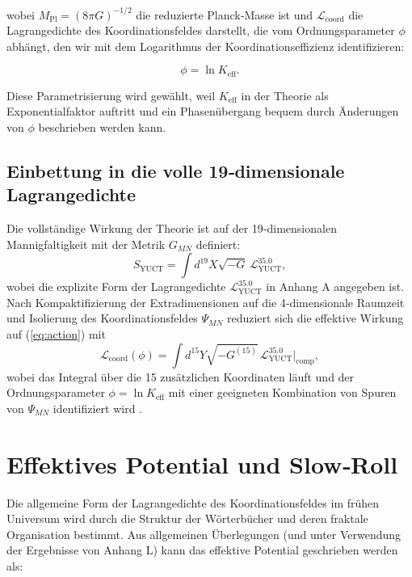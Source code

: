\documentclass[11pt,a4paper]{article}
\newcommand{\Keff}{K_{\mathrm{eff}}}
\newcommand{\Mpl}{M_{\mathrm{Pl}}}
\begin{document}
	wobei \(\Mpl = (8\pi G)^{-1/2}\) die reduzierte Planck‑Masse ist und \(\mathcal{L}_{\mathrm{coord}}\) die Lagrangedichte des Koordinationsfeldes darstellt, die vom Ordnungsparameter \(\phi\) abhängt, den wir mit dem Logarithmus der Koordinationseffizienz identifizieren:
	
	\begin{equation}
		\phi = \ln \Keff.
		\label{eq:phi-def}
	\end{equation}
	
	Diese Parametrisierung wird gewählt, weil \(\Keff\) in der Theorie als Exponentialfaktor auftritt und ein Phasenübergang bequem durch Änderungen von \(\phi\) beschrieben werden kann.
	
	\subsection{Einbettung in die volle 19‑dimensionale Lagrangedichte}
	
	Die vollständige Wirkung der Theorie ist auf der 19‑dimensionalen Mannigfaltigkeit mit der Metrik \(G_{MN}\) definiert:
	\begin{equation}
		S_{\text{YUCT}} = \int d^{19}X \sqrt{-G} \, \mathcal{L}_{\text{YUCT}}^{35.0},
		\label{eq:full-action}
	\end{equation}
	wobei die explizite Form der Lagrangedichte \(\mathcal{L}_{\text{YUCT}}^{35.0}\) in Anhang A angegeben ist. Nach Kompaktifizierung der Extradimensionen auf die 4‑dimensionale Raumzeit und Isolierung des Koordinationsfeldes \(\Psi_{MN}\) reduziert sich die effektive Wirkung auf (\ref{eq:action}) mit
	\begin{equation}
		\mathcal{L}_{\mathrm{coord}}(\phi) = \int d^{15}Y \sqrt{-G^{(15)}} \, \mathcal{L}_{\text{YUCT}}^{35.0}\big|_{\text{comp}},
	\end{equation}
	wobei das Integral über die 15 zusätzlichen Koordinaten läuft und der Ordnungsparameter \(\phi = \ln\Keff\) mit einer geeigneten Kombination von Spuren von \(\Psi_{MN}\) identifiziert wird \cite{Yakushev2026}.
	
	\section{Effektives Potential und Slow‑Roll}
	\label{sec:potential}
	
	Die allgemeine Form der Lagrangedichte des Koordinationsfeldes im frühen Universum wird durch die Struktur der Wörterbücher und deren fraktale Organisation bestimmt. Aus allgemeinen Überlegungen (und unter Verwendung der Ergebnisse von Anhang L) kann das effektive Potential geschrieben werden als:
	
\end{document}
